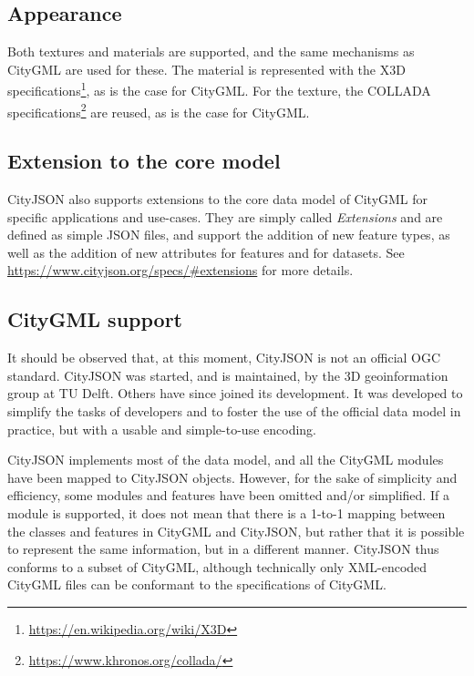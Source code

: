 \subsection{Appearance}

Both textures and materials are supported, and the same mechanisms as CityGML are used for these. 
The material is represented with the X3D specifications\footnote{\url{https://en.wikipedia.org/wiki/X3D}}, as is the case for CityGML\@. 
For the texture, the COLLADA specifications\footnote{\url{https://www.khronos.org/collada/}} are reused, as is the case for CityGML\@.


\subsection{Extension to the core model}

CityJSON also supports extensions to the core data model of CityGML for specific applications and use-cases.
They are simply called \emph{Extensions} and are defined as simple JSON files, and support the addition of new feature types, as well as the addition of new attributes for features and for datasets. 
See \url{https://www.cityjson.org/specs/#extensions} for more details.



\subsection{CityGML support}

It should be observed that, at this moment, CityJSON is not an official OGC standard.
CityJSON was started, and is maintained, by the 3D geoinformation group at TU Delft. Others have since joined its development.
It was developed to simplify the tasks of developers and to foster the use of the official data model in practice, but with a usable and simple-to-use encoding.

CityJSON implements most of the data model, and all the CityGML modules have been mapped to CityJSON objects. 
However, for the sake of simplicity and efficiency, some modules and features have been omitted and/or simplified. 
If a module is supported, it does not mean that there is a 1-to-1 mapping between the classes and features in CityGML and CityJSON, but rather that it is possible to represent the same information, but in a different manner. 
CityJSON thus conforms to a subset of CityGML, although technically only XML-encoded CityGML files can be conformant to the specifications of CityGML\@.


